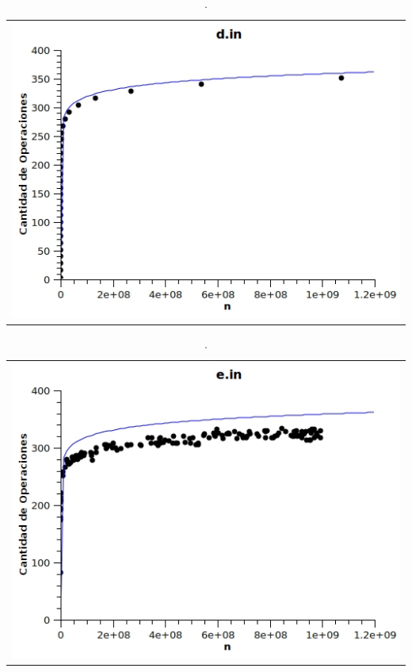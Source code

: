 	\begin{table}[ht]
		\centering 
			\begin{tabular}{c}
				\includegraphics[scale = 0.8]{./../ej1/tests/d.jpg}
			\end{tabular}
			\caption{.} 
	\end{table}

	\begin{table}[ht]
		\centering 
			\begin{tabular}{c}
				\includegraphics[scale = 0.8]{./../ej1/tests/e.jpg}
			\end{tabular}
			\caption{.} 
	\end{table}


